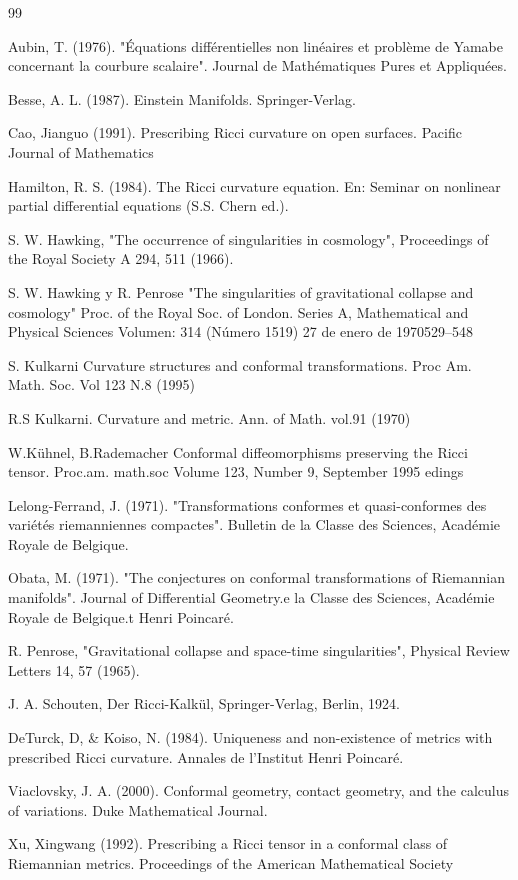 \documentclass{amsart}%
\theoremstyle{plain}
\numberwithin{equation}{section}
\begin{document}
\begin{thebibliography}{99}                                                                                               %


Aubin, T. (1976). "\'{E}quations diff\'{e}rentielles non
lin\'{e}aires et probl\`{e}me de Yamabe concernant la courbure scalaire".
Journal de Math\'{e}matiques Pures et Appliqu\'{e}es.

Besse, A. L. (1987). Einstein Manifolds. Springer-Verlag.

Cao, Jianguo (1991). Prescribing Ricci curvature on open
surfaces. Pacific Journal of Mathematics

Hamilton, R. S. (1984). The Ricci curvature equation. En:
Seminar on nonlinear partial differential equations (S.S. Chern ed.).

S. W. Hawking, "The occurrence of singularities in
cosmology", Proceedings of the Royal Society A 294, 511 (1966).

S. W. Hawking y R. Penrose "The singularities of gravitational
collapse and cosmology" Proc. of the Royal Soc. of London. Series A,
Mathematical and Physical Sciences Volumen: 314 (N\'{u}mero 1519) 27 de enero
de 1970{}529--548

S. Kulkarni Curvature structures and conformal transformations.
Proc Am. Math. Soc. Vol 123 N.8 (1995)

R.S Kulkarni. Curvature and metric. Ann. of Math. vol.91 (1970)

W.K\"{u}hnel, B.Rademacher Conformal diffeomorphisms preserving
the Ricci tensor. Proc.am. math.soc Volume 123, Number 9, September 1995 edings

Lelong-Ferrand, J. (1971). "Transformations conformes et
quasi-conformes des vari\'{e}t\'{e}s riemanniennes compactes". Bulletin de la
Classe des Sciences, Acad\'{e}mie Royale de Belgique.

Obata, M. (1971). "The conjectures on conformal
transformations of Riemannian manifolds". Journal of Differential Geometry.e
la Classe des Sciences, Acad\'{e}mie Royale de Belgique.t Henri Poincar\'{e}.

R. Penrose, "Gravitational collapse and space-time
singularities", Physical Review Letters 14, 57 (1965).

 J. A. Schouten, Der Ricci-Kalk\"{u}l, Springer-Verlag,
Berlin, 1924.

DeTurck, D, \& Koiso, N. (1984). Uniqueness and non-existence
of metrics with prescribed Ricci curvature. Annales de l'Institut Henri Poincar\'{e}.

Viaclovsky, J. A. (2000). Conformal geometry, contact
geometry, and the calculus of variations. Duke Mathematical Journal.

Xu, Xingwang (1992). Prescribing a Ricci tensor in a
conformal class of Riemannian metrics. Proceedings of the American
Mathematical Society
\end{thebibliography}
\end{document}
